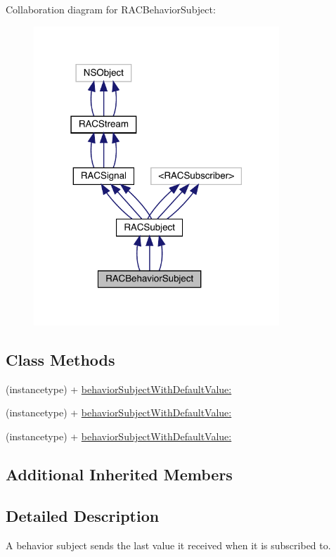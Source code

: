 Collaboration diagram for R\+A\+C\+Behavior\+Subject\+:\nopagebreak
\begin{figure}[H]
\begin{center}
\leavevmode
\includegraphics[width=262pt]{interface_r_a_c_behavior_subject__coll__graph}
\end{center}
\end{figure}
\subsection*{Class Methods}
\begin{DoxyCompactItemize}
\item 
(instancetype) + \mbox{\hyperlink{interface_r_a_c_behavior_subject_aa13b741ed2607310913d29d9862e6ea3}{behavior\+Subject\+With\+Default\+Value\+:}}
\item 
(instancetype) + \mbox{\hyperlink{interface_r_a_c_behavior_subject_aa13b741ed2607310913d29d9862e6ea3}{behavior\+Subject\+With\+Default\+Value\+:}}
\item 
(instancetype) + \mbox{\hyperlink{interface_r_a_c_behavior_subject_aa13b741ed2607310913d29d9862e6ea3}{behavior\+Subject\+With\+Default\+Value\+:}}
\end{DoxyCompactItemize}
\subsection*{Additional Inherited Members}


\subsection{Detailed Description}
A behavior subject sends the last value it received when it is subscribed to. 

